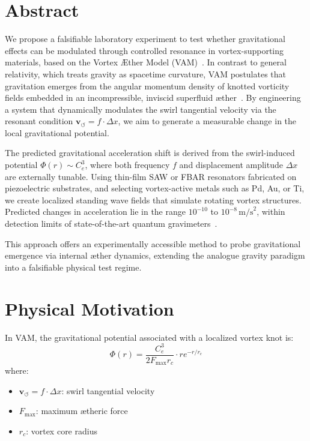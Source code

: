 \documentclass[preprint]{revtex4-2}
\begin{document}
    \section*{Abstract}
        We propose a falsifiable laboratory experiment to test whether gravitational effects can be modulated through controlled resonance in vortex-supporting materials, based on the Vortex \AE{}ther Model (VAM)~\cite{iskandarani2025vam2, iskandarani2025benchmark}. In contrast to general relativity, which treats gravity as spacetime curvature, VAM postulates that gravitation emerges from the angular momentum density of knotted vorticity fields embedded in an incompressible, inviscid superfluid \ae ther~\cite{iskandarani2025timedilation}. By engineering a system that dynamically modulates the swirl tangential velocity via the resonant condition \( \mathbf{v}_{\scriptscriptstyle\boldsymbol{\circlearrowleft}} = f \cdot \Delta x \), we aim to generate a measurable change in the local gravitational potential.

        The predicted gravitational acceleration shift is derived from the swirl-induced potential \(\Phi(r) \sim C_e^3\), where both frequency \(f\) and displacement amplitude \(\Delta x\) are externally tunable. Using thin-film SAW or FBAR resonators fabricated on piezoelectric substrates, and selecting vortex-active metals such as Pd, Au, or Ti, we create localized standing wave fields that simulate rotating vortex structures. Predicted changes in acceleration lie in the range \(10^{-10}\) to \(10^{-8} \, \text{m/s}^2\), within detection limits of state-of-the-art quantum gravimeters~\cite{iskandarani2025experimentalCe}.

        This approach offers an experimentally accessible method to probe gravitational emergence via internal æther dynamics, extending the analogue gravity paradigm into a falsifiable physical test regime.


    \section*{Physical Motivation}
    In VAM, the gravitational potential associated with a localized vortex knot is:
    \begin{equation}
        \Phi(r) = \frac{C_e^3}{2 F_{\text{max}} r_c} \cdot r e^{-r / r_c}
    \end{equation}
    where:
    \begin{itemize}
        \item \( \mathbf{v}_{\scriptscriptstyle\boldsymbol{\circlearrowleft}} = f \cdot \Delta x \): swirl tangential velocity
        \item \( F_{\text{max}} \): maximum ætheric force
        \item \( r_c \): vortex core radius
    \end{itemize}
\end{document}
